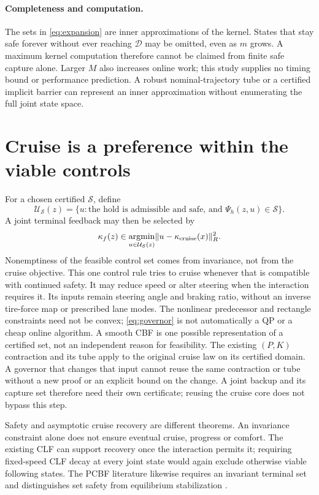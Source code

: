 \documentclass[11pt]{article}
\newcommand{\D}{\mathcal D}
\newcommand{\Sf}{\mathcal S}
\begin{document}
\paragraph{Completeness and computation.}
The sets in \eqref{eq:expansion} are inner approximations of the kernel.
States that stay safe forever without ever reaching $\D$ may be omitted,
even as $m$ grows. A maximum kernel computation therefore cannot be claimed
from finite safe capture alone. Larger $M$ also increases online work;
this study supplies no timing bound or performance prediction. A robust
nominal-trajectory tube or a certified implicit barrier can represent an
inner approximation without enumerating the full joint state space.

\section{Cruise is a preference within the viable controls}
For a chosen certified $\Sf$, define
\begin{equation}
\mathcal U_{\Sf}(z)=\{u:\text{the hold is admissible and safe, and }
\Psi_h(z,u)\in\Sf\}.
\end{equation}
A joint terminal feedback may then be selected by
\begin{equation}
\kappa_f(z)\in\underset{u\in\mathcal U_{\Sf}(z)}{\operatorname{argmin}}
\|u-\kappa_{\rm cruise}(x)\|_R^2.\label{eq:governor}
\end{equation}
Nonemptiness of the feasible control set comes from invariance, not from
the cruise objective. This one control rule tries to cruise whenever that
is compatible with continued safety. It may reduce speed or alter steering
when the interaction requires it. Its inputs remain steering angle and
braking ratio, without an inverse tire-force map or prescribed lane modes.
The nonlinear predecessor and rectangle constraints need not be convex;
\eqref{eq:governor} is not automatically a QP or a cheap online algorithm.
A smooth CBF is one possible representation of a certified set, not an
independent reason for feasibility.
The existing $(P,K)$ contraction and its tube apply to the original cruise
law on its certified domain. A governor that changes that input cannot
reuse the same contraction or tube without a new proof or an explicit
bound on the change. A joint backup and its capture set therefore need
their own certificate; reusing the cruise core does not bypass this step.

Safety and asymptotic cruise recovery are different theorems. An invariance
constraint alone does not ensure eventual cruise, progress or comfort.
The existing CLF can support recovery once the interaction permits it;
requiring fixed-speed CLF decay at every joint state would again exclude
otherwise viable following states. The PCBF literature likewise requires
an invariant terminal set and distinguishes set safety from equilibrium
stabilization \cite{pcbf}.
\end{document}
